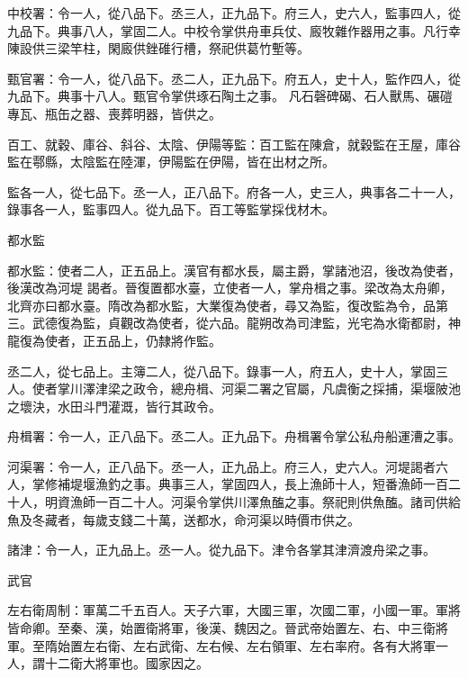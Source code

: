 \begin{pinyinscope}
 中校署：令一人，從八品下。丞三人，正九品下。府三人，史六人，監事四人，從九品下。典事八人，掌固二人。中校令掌供舟車兵仗、廄牧雜作器用之事。凡行幸陳設供三梁竿柱，閑廄供銼碓行槽，祭祀供葛竹塹等。



 甄官署：令一人，從八品下。丞二人，正九品下。府五人，史十人，監作四人，從九品下。典事十八人。甄官令掌供琢石陶土之事。
 凡石磬碑碣、石人獸馬、碾磑專瓦、瓶缶之器、喪葬明器，皆供之。



 百工、就穀、庫谷、斜谷、太陰、伊陽等監：百工監在陳倉，就穀監在王屋，庫谷監在鄠縣，太陰監在陸渾，伊陽監在伊陽，皆在出材之所。



 監各一人，從七品下。丞一人，正八品下。府各一人，史三人，典事各二十一人，錄事各一人，監事四人。從九品下。百工等監掌採伐材木。



 都水監



 都水監：使者二人，正五品上。漢官有都水長，屬主爵，掌諸池沼，後改為使者，後漢改為河堤
 謁者。晉復置都水臺，立使者一人，掌舟楫之事。梁改為太舟卿，北齊亦曰都水臺。隋改為都水監，大業復為使者，尋又為監，復改監為令，品第三。武德復為監，貞觀改為使者，從六品。龍朔改為司津監，光宅為水衛都尉，神龍復為使者，正五品上，仍隸將作監。



 丞二人，從七品上。主簿二人，從八品下。錄事一人，府五人，史十人，掌固三人。使者掌川澤津梁之政令，總舟楫、河渠二署之官屬，凡虞衡之採捕，渠堰陂池之壞決，水田斗門灌溉，皆行其政令。



 舟楫署：令一人，正八品下。丞二人。正九品下。舟楫署令掌公私舟船運漕之事。



 河渠署：令一人，正八品下。丞一人，正九品上。府三人，史六人。河堤謁者六人，掌修補堤堰漁釣之事。典事三人，掌固四人，長上漁師十人，短番漁師一百二十人，明資漁師一百二十人。河渠令掌供川澤魚醢之事。祭祀則供魚醢。諸司供給魚及冬藏者，每歲支錢二十萬，送都水，命河渠以時價市供之。



 諸津：令一人，正九品上。丞一人。從九品下。津令各掌其津濟渡舟梁之事。



 武官



 左右衛周制：軍萬二千五百人。天子六軍，大國三軍，次國二軍，小國一軍。軍將皆命卿。至秦、漢，始置衛將軍，後漢、魏因之。晉武帝始置左、右、中三衛將軍。至隋始置左右衛、左右武衛、左右候、左右領軍、左右率府。各有大將軍一人，謂十二衛大將軍也。國家因之。




\end{pinyinscope}
